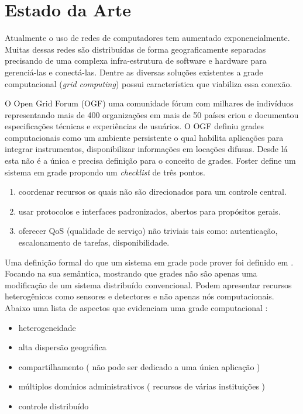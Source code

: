 \section{Estado da Arte}
\label{cap:estado da arte}

Atualmente o uso de redes de computadores tem aumentado exponencialmente. Muitas dessas redes são distribuídas de forma geograficamente separadas precisando de uma complexa infra-estrutura de software e hardware para gerenciá-las e conectá-las. Dentre as diversas soluções existentes a grade computacional (\emph{grid computing}) possui característica que viabiliza essa conexão.

O Open Grid Forum (OGF) uma comunidade fórum com milhares de indivíduos representando mais de 400 organizações em mais de 50 países criou e documentou \cite{M.2002} especificações técnicas e experiências de usuários. O OGF definiu grades computacionais como um ambiente persistente o qual habilita aplicações para integrar instrumentos, disponibilizar informações em locações difusas. Desde lá esta não é a única e precisa definição para o conceito de grades. Foster \cite{Kesselman2001} define um sistema em grade propondo um \emph{checklist} de três pontos.

\begin{enumerate}
	\item coordenar recursos os quais não são direcionados para um controle central.
	\item usar protocolos e interfaces padronizados, abertos para propósitos gerais.
	\item oferecer QoS (qualidade de serviço) não triviais tais como: autenticação, escalonamento de tarefas, disponibilidade.
\end{enumerate}

Uma definição formal do que um sistema em grade pode prover foi definido em \cite{Foster2002}. Focando na sua semântica, mostrando que grades não são apenas uma modificação de um sistema distribuído convencional. Podem apresentar recursos heterogênicos como sensores e detectores e não apenas nós computacionais. Abaixo uma lista de aspectos que evidenciam uma grade computacional \cite{Cirne2002}:

\begin{itemize}
	\item heterogeneidade
	\item alta dispersão geográfica
	\item compartilhamento ( não pode ser dedicado a uma única aplicação )
	\item múltiplos domínios administrativos ( recursos de várias instituições )
	\item controle distribuído 
\end{itemize}

